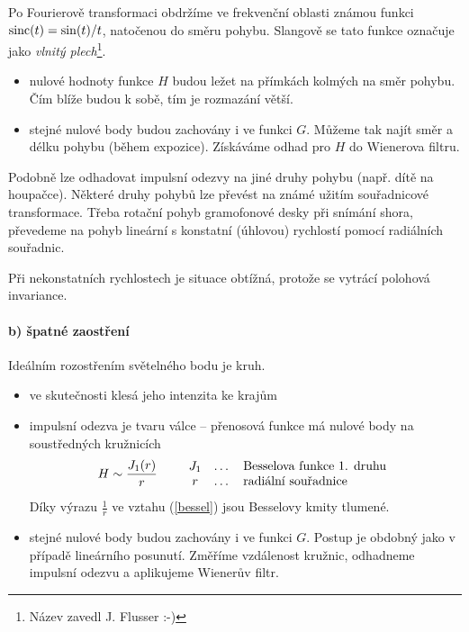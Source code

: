 Po Fourierově transformaci obdržíme ve frekvenční oblasti známou funkci $\operatorname{sinc}(t) = \sin(t)/t$, natočenou do směru pohybu. 
Slangově se tato funkce označuje jako \emph{vlnitý plech}\footnote{Název zavedl J. Flusser :-)}. 

\begin{itemize}
\item nulové hodnoty funkce $H$ budou ležet na přímkách kolmých na směr pohybu. Čím blíže budou k sobě, tím je rozmazání 
větší. 
\item stejné nulové body budou zachovány i ve funkci $G$. Můžeme tak najít směr a délku pohybu (během
expozice). Získáváme odhad pro $H$ do Wienerova filtru. 
\end{itemize}

Podobně lze odhadovat impulsní odezvy na jiné druhy pohybu (např. dítě na houpačce). Některé druhy pohybů lze převést na
známé užitím souřadnicové transformace. Třeba rotační pohyb gramofonové desky při snímání shora, převedeme na pohyb 
lineární s konstatní (úhlovou) rychlostí pomocí radiálních souřadnic.

Při nekonstatních rychlostech je situace obtížná, protože se vytrácí polohová invariance.


\paragraph{b) špatné zaostření} Ideálním rozostřením světelného bodu je kruh. 
\begin{itemize}
\item ve skutečnosti klesá jeho intenzita ke krajům
\item impulsní odezva je tvaru válce -- přenosová funkce má nulové body na soustředných kružnicích
 \begin{align}
  H\sim \frac{J_1(r)}{r}\label{bessel}\qquad\begin{array}{ccl}\hbox{$J_1$}&\hbox{\dots}&\hbox{Besselova funkce 1. druhu}\\
  \hbox{$r$}&\hbox{\dots}&\hbox{radiální souřadnice}
  \end{array}
 \end{align}
Díky výrazu $\frac{1}{r}$ ve vztahu (\ref{bessel}) jsou Besselovy kmity tlumené.

\item stejné nulové body budou zachovány i ve funkci $G$. Postup je obdobný jako v případě lineárního posunutí.
Změříme vzdálenost kružnic, odhadneme impulsní odezvu a aplikujeme Wienerův filtr. 
\end{itemize}

